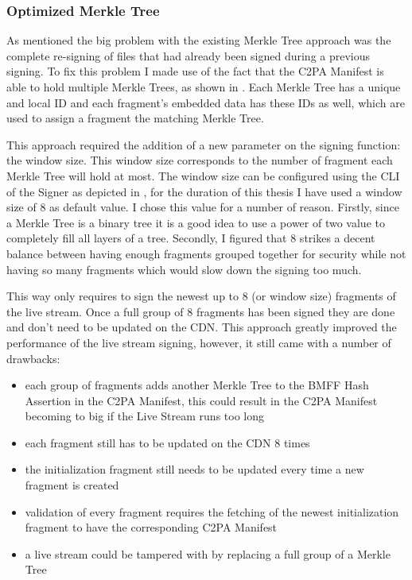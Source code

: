 \subsubsection{Optimized Merkle Tree}

As mentioned the big problem with the existing Merkle Tree approach was the complete re-signing of files that had already been signed during a previous signing. To fix this problem I made use of the fact that the C2PA Manifest is able to hold multiple Merkle Trees, as shown in . Each Merkle Tree has a unique and local ID and each fragment's embedded data has these IDs as well, which are used to assign a fragment the matching Merkle Tree.

This approach required the addition of a new parameter on the signing function: the window size. This window size corresponds to the number of fragment each Merkle Tree will hold at most. The window size can be configured using the CLI of the Signer as depicted in , for the duration of this thesis I have used a window size of $8$ as default value. I chose this value for a number of reason. Firstly, since a Merkle Tree is a binary tree it is a good idea to use a power of two value to completely fill all layers of a tree. Secondly, I figured that $8$ strikes a decent balance between having enough fragments grouped together for security while not having so many fragments which would slow down the signing too much.

This way only requires to sign the newest up to $8$ (or window size) fragments of the live stream. Once a full group of $8$ fragments has been signed they are done and don't need to be updated on the CDN. This approach greatly improved the performance of the live stream signing, however, it still came with a number of drawbacks:

\begin{itemize}
    \item each group of fragments adds another Merkle Tree to the BMFF Hash Assertion in the C2PA Manifest, this could result in the C2PA Manifest becoming to big if the Live Stream runs too long
    \item each fragment still has to be updated on the CDN $8$ times
    \item the initialization fragment still needs to be updated every time a new fragment is created
    \item validation of every fragment requires the fetching of the newest initialization fragment to have the corresponding C2PA Manifest
    \item a live stream could be tampered with by replacing a full group of a Merkle Tree
\end{itemize}

